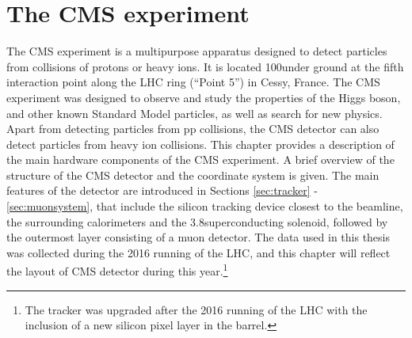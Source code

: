 \chapter{The CMS experiment}\label{sec:CMS}
\noindent\justify
The CMS experiment is a multipurpose apparatus designed to detect particles from collisions of protons or heavy ions. 
It is located 100\m under ground at the fifth interaction point along the LHC ring (``Point 5'') in Cessy, France. 
The CMS experiment was designed to observe and study the properties of the Higgs boson, and other known Standard Model particles, as well as search for new physics. 
Apart from detecting particles from pp collisions, the CMS detector can also detect particles from heavy ion collisions.  
\newpara
\noindent\justify
This chapter provides a description of the main hardware components of the CMS experiment. 
A brief overview of the structure of the CMS detector and the coordinate system is given.  
The main features of the detector are introduced in Sections \ref{sec:tracker} - \ref{sec:muonsystem}, that include the silicon tracking device closest to the beamline, the surrounding calorimeters and the 3.8\T superconducting solenoid, followed by the outermost layer consisting of a muon detector.  
The data used in this thesis was collected during the 2016 running of the LHC, and this chapter will reflect the layout of CMS detector during this year.\footnote{The tracker was upgraded after the 2016 running of the LHC with the inclusion of a new silicon pixel layer in the barrel.} 
\newpage
